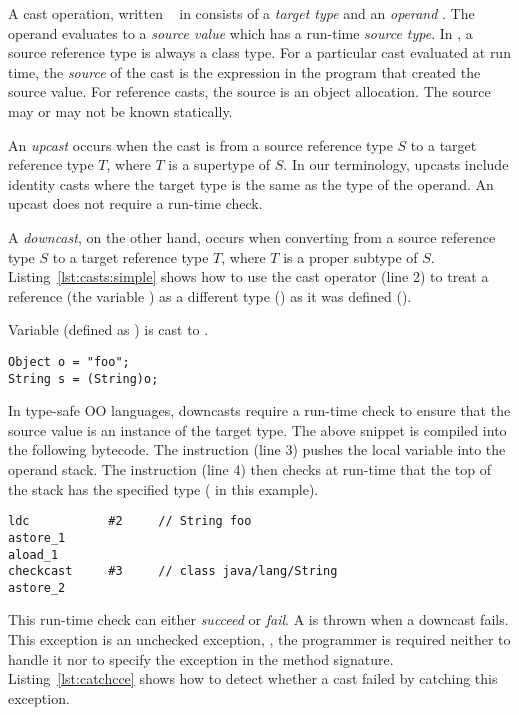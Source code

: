 A cast operation, written ~ in \java{}
consists of a \emph{target type}  and an \emph{operand} .
The operand evaluates to a \emph{source value} which has a run-time
\emph{source type}.
In \java{}, a source reference type is always a class type.
For a particular cast evaluated at run time, 
the \emph{source} of the cast is the expression in the program that
created the source value.
For reference casts, the source is an object allocation.
The source may or may not be known statically.

An \emph{upcast} occurs when the cast is from a source reference type $S$ to a target reference type $T$,
where $T$ is a supertype of $S$.
In our terminology, upcasts include identity casts where the target type
is the same as the type of the operand.
An upcast does not require a run-time check.

A \emph{downcast}, on the other hand,
occurs when converting from a source reference type $S$ to a target reference
type $T$, where $T$ is a proper subtype of $S$.
Listing~\ref{lst:casts:simple} shows how to use the cast operator (line 2) to treat a reference (the variable ) as a different type () as it was defined ().

\begin{listing}[H]
\caption{Variable  (defined as ) is cast to .}
\label{lst:casts:simple}
\begin{verbatim}
Object o = "foo"; 
String s = (String)o;
\end{verbatim}
\end{listing}

In type-safe OO languages, downcasts require
a run-time check to ensure that the source value is an instance of the target type.
The above snippet is compiled into the following \java{} bytecode.
The  instruction (line 3) pushes the local variable  into the operand stack.
The  instruction (line 4) then checks at run-time that the top of the stack has the specified type ( in this example).

\begin{lstlisting}[style=bytecode]
ldc           #2     // String foo
astore_1
aload_1
checkcast     #3     // class java/lang/String
astore_2
\end{lstlisting}


This run-time check can either \emph{succeed} or \emph{fail}.
A  is thrown when a downcast fails.
This exception is an unchecked exception, \ie,
the programmer is required neither to handle it
nor to specify the exception in the method signature.
Listing~\ref{lst:catchcce} shows how to detect whether a cast failed by catching this exception.

